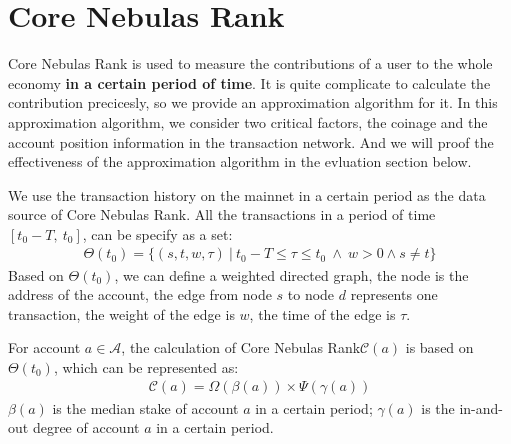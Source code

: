\section{Core Nebulas Rank}

Core Nebulas Rank is used to measure the contributions of a user to the whole economy {\textbf{in a certain period of time}}.
It is quite complicate to calculate the contribution precicesly, so we provide an approximation algorithm for it.
In this approximation algorithm, we consider two critical factors, the coinage and the account position information in the transaction network. And we will proof the effectiveness of the approximation algorithm in the evluation section below.

We use the transaction history on the mainnet in a certain period as the data source of Core Nebulas Rank.
All the transactions in a period of time $[t_0-T,\ t_0]$, can be specify as a set:
\begin{align}
\Theta(t_0) = \{(s, t, w, \tau)\ |\ t_0 - T \le \tau \le t_0\ \land \ w > 0 \land s \neq t \}
\end{align}
\noindent Based on $\Theta(t_0)$, we can define a weighted directed graph, the node is the address of the account, the edge from node $s$ to node $d$ represents one transaction,
the weight of the edge is $w$, the time of the edge is $\tau$.

For account $a \in \mathcal{A}$, the calculation of Core Nebulas Rank$\mathcal{C}(a)$ is based on $\Theta(t_0)$, which can be represented as:
\begin{align}
\mathcal{C}(a) = \Omega(\beta(a)) \times{} \Psi(\gamma(a))
\label{eq:rank}
\end{align}
\noindent $\beta(a)$ is the median stake of account $a$ in a certain period; $\gamma(a)$ is the in-and-out degree of account $a$ in a certain period.


